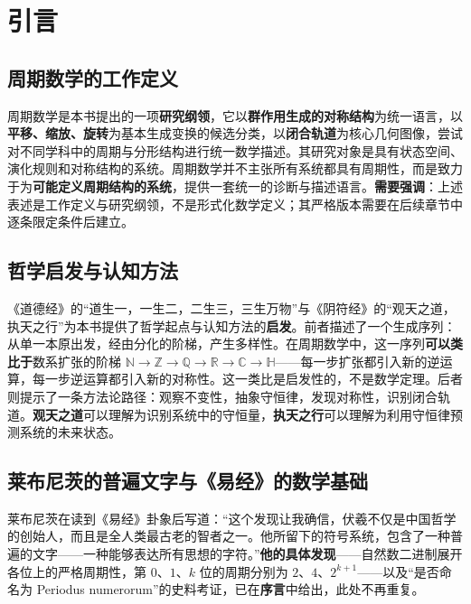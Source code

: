 \chapter*{引言}

\section*{周期数学的工作定义}

\begin{definition}
周期数学是本书提出的一项\textbf{研究纲领}，它以\textbf{群作用生成的对称结构}为统一语言，以\textbf{平移、缩放、旋转}为基本生成变换的候选分类，以\textbf{闭合轨道}为核心几何图像，尝试对不同学科中的周期与分形结构进行统一数学描述。其研究对象是具有状态空间、演化规则和对称结构的系统。周期数学并不主张所有系统都具有周期性，而是致力于为\textbf{可能定义周期结构的系统}，提供一套统一的诊断与描述语言。\textbf{需要强调}：上述表述是工作定义与研究纲领，不是形式化数学定义；其严格版本需要在后续章节中逐条限定条件后建立。
\end{definition}

\section*{哲学启发与认知方法}

《道德经》的“道生一，一生二，二生三，三生万物”与《阴符经》的“观天之道，执天之行”为本书提供了哲学起点与认知方法的\textbf{启发}。前者描述了一个生成序列：从单一本原出发，经由分化的阶梯，产生多样性。在周期数学中，这一序列\textbf{可以类比于}数系扩张的阶梯 $\mathbb{N} \to \mathbb{Z} \to \mathbb{Q} \to \mathbb{R} \to \mathbb{C} \to \mathbb{H}$——每一步扩张都引入新的逆运算，每一步逆运算都引入新的对称性。这一类比是启发性的，不是数学定理。后者则提示了一条方法论路径：观察不变性，抽象守恒律，发现对称性，识别闭合轨道。\textbf{观天之道}可以理解为识别系统中的守恒量，\textbf{执天之行}可以理解为利用守恒律预测系统的未来状态。

\section*{莱布尼茨的普遍文字与《易经》的数学基础}

莱布尼茨在读到《易经》卦象后写道：“这个发现让我确信，伏羲不仅是中国哲学的创始人，而且是全人类最古老的智者之一。他所留下的符号系统，包含了一种普遍的文字——一种能够表达所有思想的字符。”\textbf{他的具体发现}——自然数二进制展开各位上的严格周期性，第 $0$、$1$、$k$ 位的周期分别为 $2$、$4$、$2^{k+1}$——以及“是否命名为 Periodus numerorum”的史料考证，已在\textbf{序言}中给出，此处不再重复。

